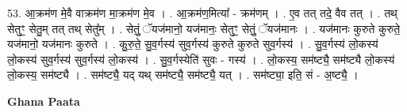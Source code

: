 \documentclass[17pt]{extarticle}
\begin{document}
53. आ॒क्रम॑ण मे॒वै वाक्रम॑ण मा॒क्रम॑ण मे॒व । . आ॒क्रम॑ण॒मित्या᳚ - क्रम॑णम् । . ए॒व तत् तदे॒ वैव तत् । . तथ् सेतुꣳ॒॒ सेतु॒म् तत् तथ् सेतु᳚म् । . सेतुं॒ ॅयज॑मानो॒ यज॑मानः॒ सेतुꣳ॒॒ सेतुं॒ ॅयज॑मानः । . यज॑मानः कुरुते कुरुते॒ यज॑मानो॒ यज॑मानः कुरुते । . कु॒रु॒ते॒ सु॒व॒र्गस्य॑ सुव॒र्गस्य॑ कुरुते कुरुते सुव॒र्गस्य॑ । . सु॒व॒र्गस्य॑ लो॒कस्य॑ लो॒कस्य॑ सुव॒र्गस्य॑ सुव॒र्गस्य॑ लो॒कस्य॑ । . सु॒व॒र्गस्येति॑ सुवः - गस्य॑ । . लो॒कस्य॒ सम॑ष्ट्यै॒ सम॑ष्ट्यै लो॒कस्य॑ लो॒कस्य॒ सम॑ष्ट्यै । . सम॑ष्ट्यै॒ यद् यथ् सम॑ष्ट्यै॒ सम॑ष्ट्यै॒ यत् । . सम॑ष्ट्या॒ इति॒ सं - अ॒ष्ट्यै॒ । \newline

\textbf{Ghana Paata } \newline
\end{document}
